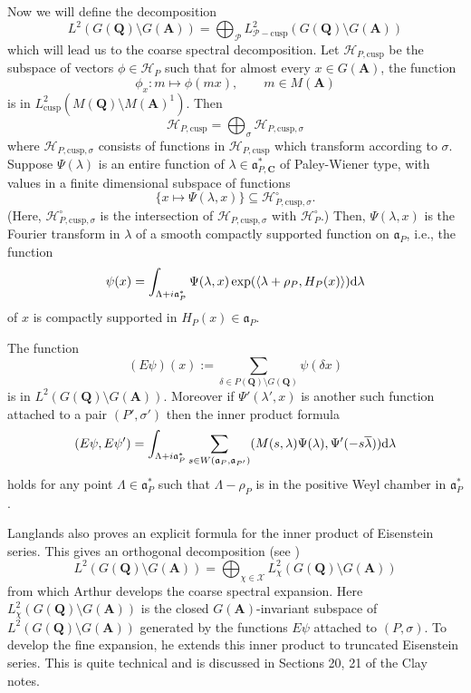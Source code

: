 \documentclass{ims9x6}
\def\A{\mathbf A}
\def\C{\mathbf C}
\def\Q{\mathbf Q}
\def\HHH{\mathcal H}
\def\PPP{\mathcal P}
\def\XXX{\mathcal X}
\def\aaa{\mathfrak a}
\def\d{\text d}
\def\bs{\setminus}
\def\cusp{\text{cusp}}
\def\Ltwo{L^2}
\def\sprod#1#2{\left\langle #1 , #2 \right\rangle}  %
\begin{document}
Now we will define the decomposition
\[ \Ltwo(G(\Q)\bs G(\A)) = \bigoplus_\PPP \Ltwo_{\PPP-\cusp}(G(\Q)\bs G(\A)) \]
which will lead us to the coarse spectral decomposition. Let $\HHH_{P, \cusp}$ be the subspace of vectors $\phi \in \HHH_P$ such that for almost every $x \in G(\A)$, the function
\[ \phi_x : m \mapsto \phi(mx) , \qquad m \in M(\A) \]
is in $\Ltwo_{\cusp}(M(\Q)\bs M(\A)^1)$. Then
\[ \HHH_{P, \cusp} = \bigoplus_\sigma \HHH_{P, \cusp, \sigma} \]
where $\HHH_{P, \cusp, \sigma}$ consists of functions in $\HHH_{P, \cusp}$ which transform according to $\sigma$. Suppose $\Psi(\lambda)$ is an entire function of $\lambda \in \aaa_{P, \C}^*$ of Paley-Wiener type, with values in a finite dimensional subspace of functions
\[ \{ x \mapsto \Psi(\lambda, x) \} \subseteq \HHH_{P, \cusp, \sigma}^\circ. \]
(Here, $\HHH_{P, \cusp, \sigma}^\circ$ is the intersection of $\HHH_{P, \cusp, \sigma}$ with $\HHH_P^\circ$.) Then, $\Psi(\lambda, x)$ is the Fourier transform in $\lambda$ of a smooth compactly supported function on $\aaa_P$, i.e., the function
\[ \psi(x) = \int_{\Lambda + i\aaa_P^*} \Psi(\lambda, x) \exp(\sprod{\lambda + \rho_P}{H_P(x)}) \d \lambda \]
of $x$ is compactly supported in $H_P(x) \in \aaa_P$. 
\begin{lemma} \cite[\S 10]{MR0249539}
	The function 
	\[ (E\psi)(x) := \sum_{\delta \in P(\Q)\bs G(\Q)} \psi(\delta x) \]
	is in $\Ltwo(G(\Q)\bs G(\A))$. Moreover if $\Psi'(\lambda', x)$ is another such function attached to a pair $(P', \sigma')$ then the inner product formula
	\[ (E\psi, E\psi') = \int_{\Lambda + i\aaa_P^*} \sum_{s \in W(\aaa_P, \aaa_{P'})}
				(M(s, \lambda)\Psi(\lambda), \Psi'(-s\overline \lambda)) \d \lambda \]
	holds for any point $\Lambda \in \aaa_P^*$ such that $\Lambda - \rho_P$ is in the positive Weyl chamber in $\aaa_P^*$. 
\end{lemma}

Langlands also proves an explicit formula for the inner product of Eisenstein series. This gives an orthogonal decomposition (see \cite[p.~65]{clay})
\begin{equation} \label{hpchi}
	\Ltwo(G(\Q)\bs G(\A)) = \bigoplus_{\chi \in \XXX} \Ltwo_\chi(G(\Q)\bs G(\A))
\end{equation}
from which Arthur develops the coarse spectral expansion. Here $\Ltwo_\chi(G(\Q)\bs G(\A))$ is the closed $G(\A)$-invariant subspace of $\Ltwo(G(\Q)\bs G(\A))$ generated by the functions $E\psi$ attached to $(P, \sigma)$. To develop the fine expansion, he extends this inner product to truncated Eisenstein series. This is quite technical and is discussed in Sections 20, 21 of the Clay notes. 
\end{document}
